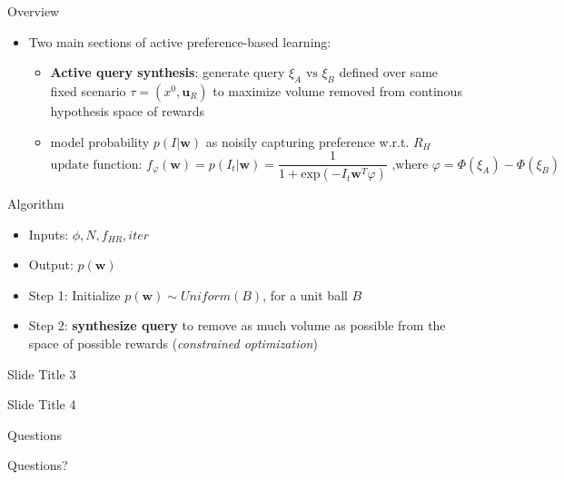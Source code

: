 \documentclass[9pt,mathserif]{beamer}
\begin{document}
\begin{frame}[t]{Overview}
	\begin{itemize}	\itemsep 0.05in
	\item Two main sections of active preference-based learning:
	\begin{itemize} \itemsep 0.025in
		\item \textbf{Active query synthesis}: generate query $\xi_A \text{ vs } \xi_B$ defined over same fixed scenario $\tau = (x^0,\textbf{u}_R)$ to maximize volume removed from continous hypothesis space of rewards 
		\item model probability $p(I|\textbf{w})$ as noisily capturing preference w.r.t. $R_H$
			$$\text{update function: } f_{\varphi}(\textbf{w})=p(I_t|\textbf{w})=\frac{1}{1+\text{exp}(-I_t\textbf{w}^T\varphi)} \text{ ,where } \varphi = \Phi(\xi_A)-\Phi(\xi_B)$$
	\end{itemize}
	\end{itemize}
\end{frame}

\begin{frame}[t]{Algorithm}
	\begin{itemize}	\itemsep 0.05in
		\item Inputs: $\phi, N, f_{HR}, iter$
		\item Output: $p(\textbf{w})$
		\item Step 1: Initialize $p(\textbf{w}) \sim Uniform(B)$, for a unit ball $B$
		\item Step 2: \textbf{synthesize query} to remove as much volume as possible from the space of possible rewards (\textit{constrained optimization})
	\end{itemize}

\end{frame}

\begin{frame}[t]{Slide Title 3}

\end{frame}

\begin{frame}[t]{Slide Title 4}

\end{frame}

\begin{frame}[t]{Questions}
	\begin{center} \Huge Questions? \end{center}
\end{frame}

\setcounter{finalframe}{\value{framenumber}}
\end{document}

